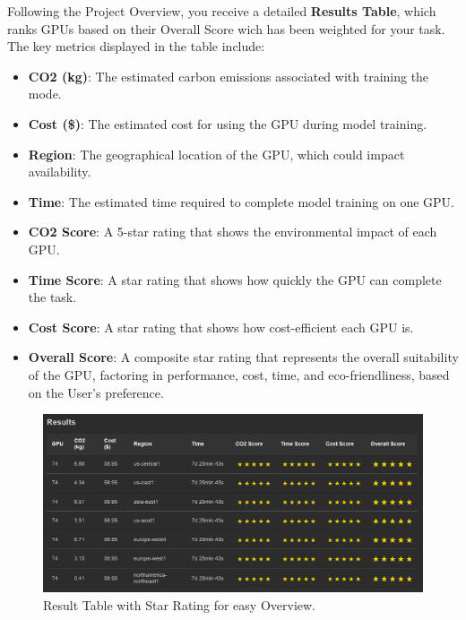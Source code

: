 \documentclass{report}
\begin{document}
\newpage
Following the Project Overview, you receive a detailed \textbf{Results Table}, which ranks GPUs based on their Overall Score wich has been weighted for your task. The key metrics displayed in the table include:

\begin{itemize}
    \item \textbf{CO2 (kg)}: The estimated carbon emissions associated with training the mode.
    
    \item \textbf{Cost (\$)}: The estimated cost for using the GPU during model training.
    
    \item \textbf{Region}: The geographical location of the GPU, which could impact availability.
    
    \item \textbf{Time}: The estimated time required to complete model training on one GPU.
    
    \item \textbf{CO2 Score}: A 5-star rating that shows the environmental impact of each GPU.
    
    \item \textbf{Time Score}: A star rating that shows how quickly the GPU can complete the task.
    
    \item \textbf{Cost Score}: A star rating that shows how cost-efficient each GPU is.
    
    \item \textbf{Overall Score}: A composite star rating that represents the overall suitability of the GPU, factoring in performance, cost, time, and eco-friendliness, based on the User's preference.
\end{itemize}

\begin{figure}[h]
    \centering
    \includegraphics[width=1\linewidth]{04.png}
    \caption{Result Table with Star Rating for easy Overview.}
    \label{fig:enter-label}
\end{figure}
\end{document}
